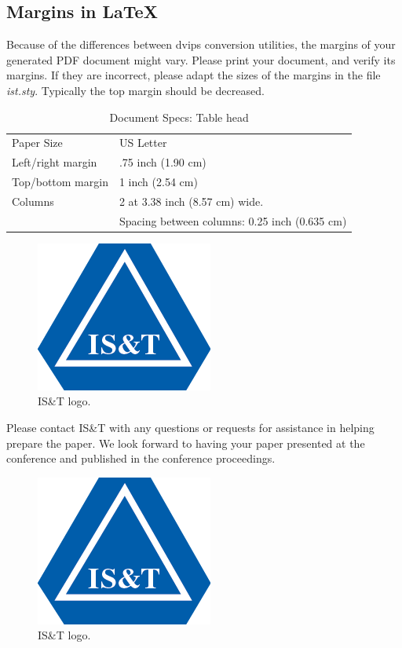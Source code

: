 \documentclass[letterpaper,twocolumn,fleqn]{article}
\begin{document}
\subsection{Margins in LaTeX}
Because of the differences between dvips conversion utilities, the
margins of your generated PDF document might vary. Please print
your document, and verify its margins. If they are incorrect, please
adapt the sizes of the margins in the file \emph{ist.sty}. Typically the
top margin should be decreased.

\begin{table}[!h]
\caption{Document Specs: Table head}
\label{tab:specs}
\begin{center}       
\begin{tabular}{p{}p{}} 
Paper Size & US Letter \\
Left/right margin & .75 inch (1.90 cm) \\
Top/bottom margin & 1 inch (2.54 cm) \\
Columns & 2 at 3.38 inch (8.57 cm) wide. \\
 & Spacing between columns: 0.25 inch (0.635 cm)
\end{tabular}
\end{center}
\end{table} 

\begin{figure}[!hb]
  \includegraphics[width=0.3\columnwidth]{logo.png}
  \caption{IS\&T logo.}
  \label{Figure:logo}
\end{figure}

Please contact IS\&T with any questions or requests for assistance in
helping prepare the paper. We look forward to having your paper
presented at the conference and published in the conference
proceedings.

\begin{figure}[!hb]
  \includegraphics[width=0.3\columnwidth]{logo.png}
  \caption{IS\&T logo.}
  \label{Figure:logo}
\end{figure}
\end{document}
